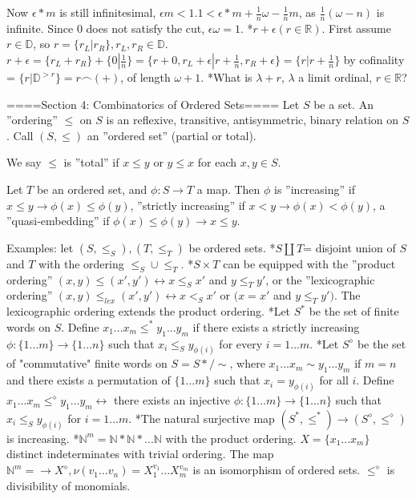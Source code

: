 Now $\epsilon *m$ is still infinitesimal, $\epsilon m <1.   1< \epsilon *m+\frac{1}{n}\omega - \frac{1}{n}m$, as $\frac{1}{n}(\omega -n)$ is infinite. Since $0$ does not satisfy the cut, $\epsilon \omega =1$.
*$r + \epsilon (r \in \mathbb{R})$. First assume $r \in \mathbb{D}$, so $r=\{r_L|r_R\}, r_L, r_R \in \mathbb{D}$. $r + \epsilon = \{r_L + r_R\} + \{0|\frac{1}{n}\}=\{r+0, r_L + \epsilon|r+\frac{1}{n}, r_R + \epsilon\}= \{r|r+\frac{1}{n}\}$ by cofinality = $\{r|\mathbb{D}^{>r}\}=r\frown(+)$, of length $\omega +1$.
*What is $\lambda +r$, $\lambda$ a limit ordinal, $r \in \mathbb{R}$?

====Section 4: Combinatorics of Ordered Sets====
Let $S$ be a set. An ''ordering'' $\leq$ on $S$ is an reflexive, transitive, antisymmetric, binary relation on $S$. Call $(S,\leq)$ an ''ordered set'' (partial or total).

We say $\leq$ is ''total'' if $x \leq y$ or $y \leq x$ for each $x, y \in S$.

Let $T$ be an ordered set, and $\phi: S \rightarrow T$ a map. Then $\phi$ is ''increasing'' if $x \leq y \rightarrow \phi(x) \leq \phi(y)$, ''strictly increasing'' if $x < y \rightarrow \phi(x) < \phi(y)$, a ''quasi-embedding'' if $\phi(x) \leq \phi(y) \rightarrow x \leq y$.

Examples: let $(S, \leq_S), (T, \leq_T)$ be ordered sets.
*$S \coprod T$= disjoint union of $S$ and $T$ with the ordering $\leq_S \cup \leq_T$.
*$S \times T$ can be equipped with the ''product ordering'' $(x,y)\leq(x',y') \leftrightarrow x \leq_S x'$ and $y \leq_T y'$, or the ''lexicographic ordering'' $(x,y) \leq_{lex} (x',y') \leftrightarrow x <_S x'$ or $(x=x'$ and $y \leq_T y')$. The lexicographic ordering extends the product ordering.
*Let $S^*$ be the set of finite words on $S$. Define $x_{1}...x_{m} \leq^{*} y_{1}...y_{m}$ if there exists a strictly increasing $\phi: \{1...m\} \rightarrow \{1...n\}$ such that $x_i \leq_S y_{\phi(i)}$ for every $i=1...m$.
*Let $S^\diamond$ be the set of "commutative" finite words on $S=S*/ \sim$, where $x_{1}...x_{m} \sim y_{1}...y_{m}$ if $m=n$ and there exists a permutation of $\{1...m\}$ such that $x_i = y_{\phi(i)}$ for all $i$. Define  $x_{1}...x_{m} \leq^{\diamond} y_{1}...y_{m} \leftrightarrow$ there exists an injective $\phi: \{1...m\} \rightarrow \{1...n\}$ such that $x_i \leq_S y_{\phi(i)}$ for $i=1...m$.
*The natural surjective map $(S^*, \leq^*) \rightarrow (S^\diamond, \leq^\diamond)$ is increasing.
*$\mathbb{N}^m=\mathbb{N} * \mathbb{N} * ...\mathbb{N}$ with the product ordering. $X=\{x_1...x_m\}$ distinct indeterminates with trivial ordering. The map $\mathbb{N}^m= \rightarrow X^\diamond, \nu(v_1...v_n)=X_{1}^{v_1}...X_{m}^{v_m}$ is an isomorphism of ordered sets. $\leq^\diamond$ is divisibility of monomials.

